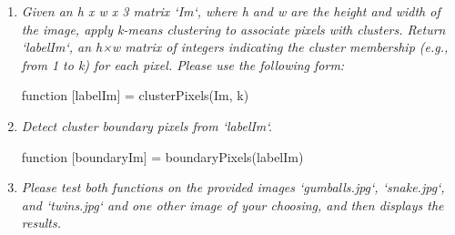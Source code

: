 \documentclass[11pt]{article}
\begin{document}
    \begin{enumerate}
        \item \textit{Given an h x w x 3 matrix ‘Im‘, where h and w are the height and width of the image, apply k-means clustering to
        associate pixels with clusters. Return ‘labelIm‘, an h×w matrix of integers indicating the cluster membership (e.g., from 1 to k) for each pixel.
        Please use the following form:}
        \begin{center}
            function [labelIm] = clusterPixels(Im, k)
        \end{center}
        \text{}

        \item \textit{Detect cluster boundary pixels from ‘labelIm‘.}
        \begin{center}
            function [boundaryIm] = boundaryPixels(labelIm)
        \end{center}
        \text{}

        \item \textit{Please test both functions on the provided images ‘gumballs.jpg‘, ‘snake.jpg‘, and ‘twins.jpg‘ and one other image of your
        choosing, and then displays the results.}
        \text{}

    \end{enumerate}
\end{document}
